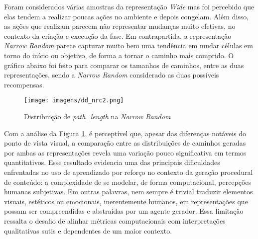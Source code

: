 \FloatBarrier

Foram considerados várias amostras da representação \textit{Wide} mas foi percebido que elas tendem a realizar poucas ações
no ambiente e depois congelam. Além disso, as ações que realizam parecem não representar mudanças muito efetivas, no
contexto da criação e execução da fase. Em contrapartida, a representação \textit{Narrow Random} parece capturar muito bem
uma tendência em mudar células em torno do início ou objetivo, de forma a tornar o caminho mais comprido. O gráfico abaixo
foi feito para comparar os tamanhos de caminhos, entre as duas representações, sendo a \textit{Narrow Random} considerado
as duas possíveis recompensas.

\begin{figure}[htb]
	\caption{\label{dd_nrc2}Distribuição de \textit{path\_length} na \textit{Narrow Random}}
	\begin{center}
	    \texttt{[image: imagens/dd\_nrc2.png]}
	\end{center}
\end{figure}

\FloatBarrier
Com a análise da Figura \ref{dd_nrc2}, é perceptível que, apesar das diferenças notáveis do ponto de vista visual, a comparação 
entre as distribuições de caminhos geradas por ambas as representações revela uma 
variação pouco significativa em termos quantitativos. Esse resultado evidencia uma 
das principais dificuldades enfrentadas no uso de aprendizado por reforço no contexto 
da geração procedural de conteúdo: a complexidade de se modelar, de forma computacional, 
percepções humanas subjetivas. Em outras palavras, nem sempre é trivial traduzir elementos 
visuais, estéticos ou emocionais, inerentemente humanos, em representações que possam ser 
compreendidas e abstraídas por um agente gerador. Essa limitação ressalta o desafio de alinhar 
métricas computacionais com interpretações qualitativas sutis e dependentes de um maior contexto.



